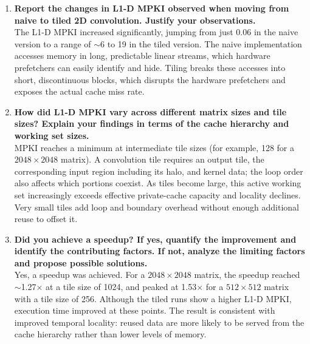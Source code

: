 \begin{enumerate}
    \item \textbf{Report the changes in L1-D MPKI observed when moving from naive to tiled 2D convolution. Justify your observations.} \\
    The L1-D MPKI increased significantly, jumping from just 0.06 in the naive version to a range of $\sim$6 to 19 in the tiled version. The naive implementation accesses memory in long, predictable linear streams, which hardware prefetchers can easily identify and hide. Tiling breaks these accesses into short, discontinuous blocks, which disrupts the hardware prefetchers and exposes the actual cache miss rate.
    
    \item \textbf{How did L1-D MPKI vary across different matrix sizes and tile sizes? Explain your findings in terms of the cache hierarchy and working set sizes.} \\
    MPKI reaches a minimum at intermediate tile sizes (for example, 128 for a $2048 \times 2048$ matrix). A convolution tile requires an output tile, the corresponding input region including its halo, and kernel data; the loop order also affects which portions coexist. As tiles become large, this active working set increasingly exceeds effective private-cache capacity and locality declines. Very small tiles add loop and boundary overhead without enough additional reuse to offset it.
    
    \item \textbf{Did you achieve a speedup? If yes, quantify the improvement and identify the contributing factors. If not, analyze the limiting factors and propose possible solutions.} \\
    Yes, a speedup was achieved. For a $2048 \times 2048$ matrix, the speedup reached $\sim$1.27$\times$ at a tile size of 1024, and peaked at 1.53$\times$ for a $512 \times 512$ matrix with a tile size of 256. Although the tiled runs show a higher L1-D MPKI, execution time improved at these points. The result is consistent with improved temporal locality: reused data are more likely to be served from the cache hierarchy rather than lower levels of memory.
\end{enumerate}
